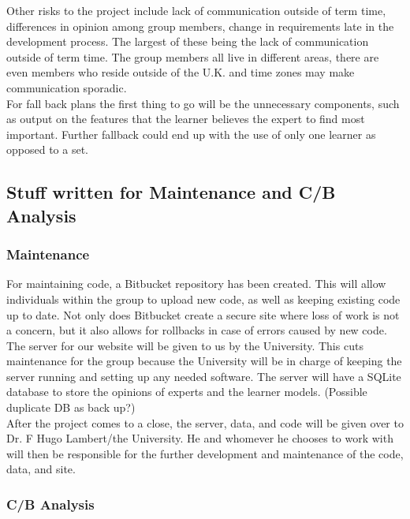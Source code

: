 \documentclass{ecmm427_assignment}
\begin{document}
\quad Other risks to the project include lack of communication outside of term time, differences in opinion among group members, change in requirements late in the development process. The largest of these being the lack of communication outside of term time. The group members all live in different areas, there are even members who reside outside of the U.K. and time zones may make communication sporadic. \\

\quad For fall back plans the first thing to go will be the unnecessary components, such as output on the features that the learner believes the expert to find most important. Further fallback could end up with the use of only one learner as opposed to a set.\\

\subsection{Stuff written for Maintenance and C/B Analysis}

\subsubsection{Maintenance}
\quad For maintaining code, a Bitbucket repository has been created. This will allow individuals within the group to upload new code, as well as keeping existing code up to date.  Not only does Bitbucket create a secure site where loss of work is not a concern, but it also allows for rollbacks in case of errors caused by new code.\\

\quad The server for our website will be given to us by the University. This cuts maintenance for the group because the University will be in charge of keeping the server running and setting up any needed software. The server will have a SQLite database to store the opinions of experts and the learner models. (Possible duplicate DB as back up?)\\

\quad After the project comes to a close, the server, data, and code will be given over to Dr. F Hugo Lambert/the University. He and whomever he chooses to work with will then be responsible for the further development and maintenance of the code, data, and site.\\


\subsubsection{C/B Analysis}
\end{document}

